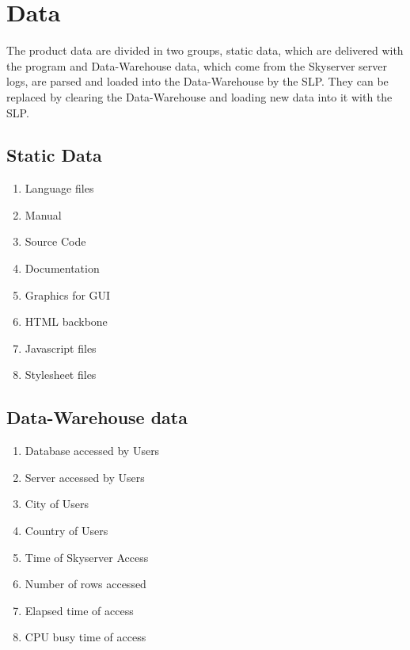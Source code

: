 \section{Data}
The product data are divided in two groups, static data, 
which are delivered with the program and Data-Warehouse data, 
which come from the Skyserver server logs, are parsed 
and loaded into the Data-Warehouse by the SLP. They can be replaced 
by clearing the Data-Warehouse and loading new data into it with the SLP.
\renewcommand{\theenumi}{/D\arabic{enumi}0/}
\renewcommand{\labelenumi}{\theenumi}

\subsection{Static Data}

\begin{enumerate}
  \item Language files
  \item Manual
  \item Source Code
  \item Documentation
  \item Graphics for GUI
  \item HTML backbone
  \item Javascript files
  \item Stylesheet files
\end{enumerate}

\subsection{Data-Warehouse data}

\begin{enumerate}[resume] %
  \item Database accessed by Users
  \item Server accessed by Users
  \item City of Users
  \item Country of Users
  \item Time of Skyserver Access
  \item Number of rows accessed
  \item Elapsed time of access
  \item CPU busy time of access
\end{enumerate}